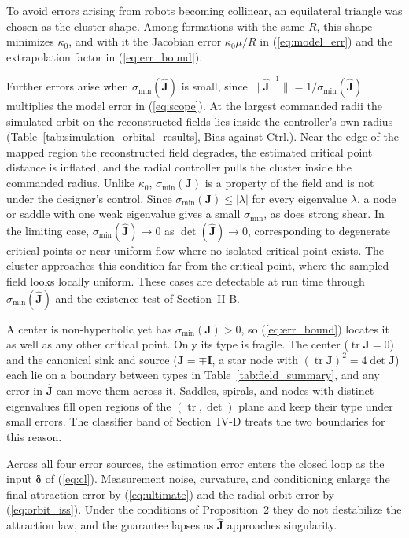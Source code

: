 \documentclass[lettersize,journal]{IEEEtran}
\begin{document}
To avoid errors arising from robots becoming collinear, an equilateral triangle was chosen as the cluster shape. Among formations with the same $R$, this shape minimizes $\kappa_0$, and with it the Jacobian error $\kappa_0\mu/R$ in (\ref{eq:model_err}) and the extrapolation factor in (\ref{eq:err_bound}).

Further errors arise when $\sigma_{\min}(\hat{\mathbf{J}})$ is small, since $\|\hat{\mathbf{J}}^{-1}\| = 1/\sigma_{\min}(\hat{\mathbf{J}})$ multiplies the model error in (\ref{eq:scope}). At the largest commanded radii the simulated orbit on the reconstructed fields lies inside the controller's own radius (Table~\ref{tab:simulation_orbital_results}, Bias against Ctrl.). Near the edge of the mapped region the reconstructed field degrades, the estimated critical point distance is inflated, and the radial controller pulls the cluster inside the commanded radius. Unlike $\kappa_0$, $\sigma_{\min}(\mathbf{J})$ is a property of the field and is not under the designer's control. Since $\sigma_{\min}(\mathbf{J}) \le |\lambda|$ for every eigenvalue $\lambda$, a node or saddle with one weak eigenvalue gives a small $\sigma_{\min}$, as does strong shear. In the limiting case, $\sigma_{\min}(\hat{\mathbf{J}}) \to 0$ as $\det(\hat{\mathbf{J}}) \to 0$, corresponding to degenerate critical points or near-uniform flow where no isolated critical point exists. The cluster approaches this condition far from the critical point, where the sampled field looks locally uniform. These cases are detectable at run time through $\sigma_{\min}(\hat{\mathbf{J}})$ and the existence test of Section~II-B.

A center is non-hyperbolic yet has $\sigma_{\min}(\mathbf{J}) > 0$, so (\ref{eq:err_bound}) locates it as well as any other critical point. Only its type is fragile. The center ($\operatorname{tr}\mathbf{J} = 0$) and the canonical sink and source ($\mathbf{J} = \mp\mathbf{I}$, a star node with $(\operatorname{tr}\mathbf{J})^2 = 4\det\mathbf{J}$) each lie on a boundary between types in Table~\ref{tab:field_summary}, and any error in $\hat{\mathbf{J}}$ can move them across it. Saddles, spirals, and nodes with distinct eigenvalues fill open regions of the $(\operatorname{tr}, \det)$ plane and keep their type under small errors. The classifier band of Section~IV-D treats the two boundaries for this reason.

Across all four error sources, the estimation error enters the closed loop as the input $\boldsymbol{\delta}$ of (\ref{eq:cl}). Measurement noise, curvature, and conditioning enlarge the final attraction error by (\ref{eq:ultimate}) and the radial orbit error by (\ref{eq:orbit_iss}). Under the conditions of Proposition~2 they do not destabilize the attraction law, and the guarantee lapses as $\hat{\mathbf{J}}$ approaches singularity.
\end{document}

